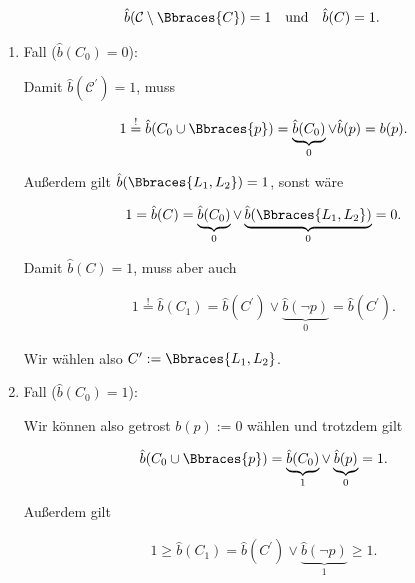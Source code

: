 \begin{solution}
\begin{align*}
    \hat b(\mathcal C \setminus \Bbraces{C}) = 1
    \quad
    \text{und}
    \quad
    \hat b(C) = 1.
\end{align*}

\begin{enumerate}[label = \arabic*.]

    \item Fall ($\hat b(C_0) = 0$):
    
    Damit $\hat b(\mathcal C^\prime) = 1$, muss

    \begin{align*}
        1
        \stackrel{!}{=}
        \hat b(C_0 \cup \Bbraces{p})
        =
        \underbrace{\hat b(C_0)}_0
        \lor
        \hat b(p)
        =
        b(p).
    \end{align*}

    Außerdem gilt $\hat b(\Bbraces{L_1, L_2}) = 1$, sonst wäre

    \begin{align*}
        1
        =
        \hat b(C)
        =
        \underbrace{\hat b(C_0)}_0
        \lor
        \underbrace{\hat b(\Bbraces{L_1, L_2})}_0
        =
        0.
    \end{align*}

    Damit $\hat b(C) = 1$, muss aber auch

    \begin{align*}
        1
        \stackrel{!}{=}
        \hat b(C_1)
        =
        \hat b(C^\prime)
        \lor
        \underbrace{\hat b(\neg p)}_0
        =
        \hat b(C^\prime).
    \end{align*}

    Wir wählen also $C^\prime := \Bbraces{L_1, L_2}$.

    \item Fall ($\hat b(C_0) = 1$):
    
    Wir können also getrost $b(p) := 0$ wählen und trotzdem gilt

    \begin{align*}
        \hat b(C_0 \cup \Bbraces{p})
        =
        \underbrace{\hat b(C_0)}_1
        \lor
        \underbrace{\hat b(p)}_0
        =
        1.
    \end{align*}

    Außerdem gilt

    \begin{align*}
        1
        \geq
        \hat b(C_1)
        =
        \hat b(C^\prime)
        \lor
        \underbrace{\hat b(\neg p)}_1
        \geq
        1.
    \end{align*}


\end{enumerate}
\end{solution}
